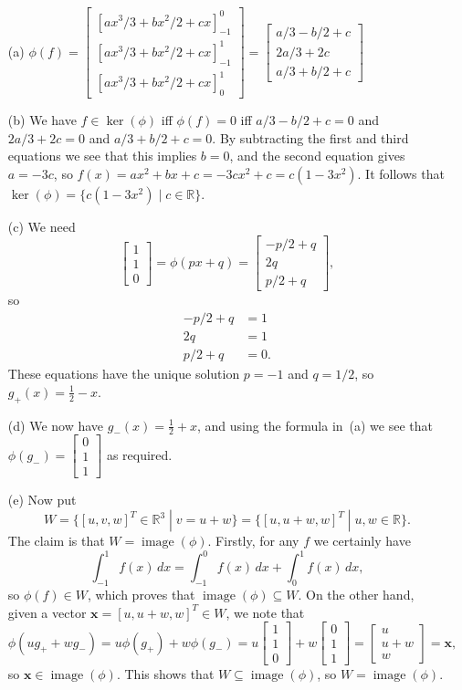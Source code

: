 \documentclass{amsart}
\newcommand{\R}         {{\mathbb{R}}}
\newcommand{\img}       {\operatorname{image}}
\newcommand{\bbm}       {\left[\begin{matrix}}
\newcommand{\ebm}       {\end{matrix}\right]}
\newcommand{\bsm}       {\left[\begin{smallmatrix}}
\newcommand{\esm}       {\end{smallmatrix}\right]}
\newcommand{\sse}       {\subseteq}
\newcommand{\st}        {\;|\;}
\newcommand{\half}      {{\textstyle\frac{1}{2}}}
\newcommand{\vx}        {\mathbf{x}}
\renewcommand{\:}       {\colon}
\theoremstyle{definition}
\renewenvironment{solution}{\SolutionAtEnd}{\endSolutionAtEnd}
\begin{document}
\begin{solution}
 \begin{itemize}
  \item[(a)] $\displaystyle
    \phi(f) =
     \bbm
      [ax^3/3+bx^2/2+cx]_{-1}^0 \\
      [ax^3/3+bx^2/2+cx]_{-1}^1 \\
      [ax^3/3+bx^2/2+cx]_0^1 
     \ebm = 
     \bbm
      a/3-b/2+c \\ 2a/3+2c \\ a/3+b/2+c
     \ebm
   $
  \item[(b)] We have $f\in\ker(\phi)$ iff $\phi(f)=0$ iff
   $a/3-b/2+c=0$ and $2a/3+2c=0$ and $a/3+b/2+c=0$.  By
   subtracting the first and third equations we see that
   this implies $b=0$, and the second equation gives
   $a=-3c$, so $f(x)=ax^2+bx+c=-3cx^2+c=c(1-3x^2)$.  It
   follows that $\ker(\phi)=\{c(1-3x^2)\st c\in\R\}$.
  \item[(c)] We need 
   \[ \bsm 1\\1\\0\esm = \phi(px+q) = 
      \bsm -p/2+q \\ 2q \\ p/2+q \esm, \]
   so
   \begin{align*}
    -p/2 + q &= 1  \\
    2q       &= 1  \\
     p/2 + q &= 0. 
   \end{align*}
   These equations have the unique solution  $p=-1$ and
   $q=1/2$, so $g_+(x)=\half - x$.  
  \item[(d)] We now have $g_-(x)=\half+x$, and using the
   formula in~(a) we see that $\phi(g_-)=\bsm 0\\1\\1\esm$
   as required.
  \item[(e)] Now put 
   \[ W = \{[u,v,w]^T\in\R^3\st v=u+w\} = 
          \{[u,u+w,w]^T\st u,w\in\R\}.
   \]
   The claim is that $W=\img(\phi)$.  Firstly, for any $f$
   we certainly have
   \[ \int_{-1}^1 f(x)\,dx = 
      \int_{-1}^0 f(x)\,dx +
      \int_0^1 f(x)\,dx,
   \]
   so $\phi(f)\in W$, which proves that $\img(\phi)\sse W$.
   On the other hand, given a vector $\vx=[u,u+w,w]^T\in W$,
   we note that 
   \[ \phi(ug_++wg_-) = 
       u\phi(g_+) + w \phi(g_-) = 
       u \bsm 1\\1\\0\esm + w \bsm 0\\1\\1\esm = 
       \bsm u\\ u+w\\ w\esm = \vx,
   \] 
   so $\vx\in\img(\phi)$.  This shows that
   $W\sse\img(\phi)$, so $W=\img(\phi)$.
 \end{itemize}
\end{solution}
\end{document}
